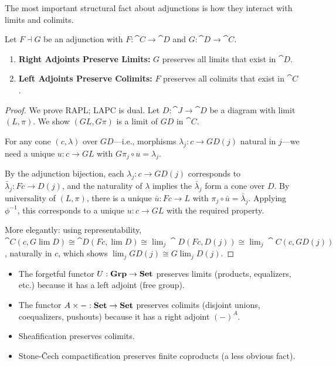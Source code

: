 The most important structural fact about adjunctions is how they interact with limits and colimits.

\begin{theorem}
\label{thm:rapl-lapc}
Let $F \dashv G$ be an adjunction with $F: \cat{C} \to \cat{D}$ and $G: \cat{D} \to \cat{C}$.
\begin{enumerate}
  \item[(RAPL)] \textbf{Right Adjoints Preserve Limits:} $G$ preserves all limits that exist in $\cat{D}$.
  \item[(LAPC)] \textbf{Left Adjoints Preserve Colimits:} $F$ preserves all colimits that exist in $\cat{C}$.
\end{enumerate}
\end{theorem}

\begin{proof}
We prove RAPL; LAPC is dual. Let $D: \cat{J} \to \cat{D}$ be a diagram with limit $(L, \pi)$. We show $(GL, G\pi)$ is a limit of $GD$ in $\cat{C}$.

For any cone $(c, \lambda)$ over $GD$—i.e., morphisms $\lambda_j: c \to GD(j)$ natural in $j$—we need a unique $u: c \to GL$ with $G\pi_j \circ u = \lambda_j$.

By the adjunction bijection, each $\lambda_j: c \to GD(j)$ corresponds to $\bar\lambda_j: Fc \to D(j)$, and the naturality of $\lambda$ implies the $\bar\lambda_j$ form a cone over $D$. By universality of $(L, \pi)$, there is a unique $\bar u: Fc \to L$ with $\pi_j \circ \bar u = \bar\lambda_j$. Applying $\phi^{-1}$, this corresponds to a unique $u: c \to GL$ with the required property.

More elegantly: using representability, $\cat{C}(c, G\lim D) \cong \cat{D}(Fc, \lim D) \cong \lim_j \cat{D}(Fc, D(j)) \cong \lim_j \cat{C}(c, GD(j))$, naturally in $c$, which shows $\lim_j GD(j) \cong G \lim_j D(j)$.
\end{proof}

\begin{example}[Consequences]
\begin{itemize}
  \item The forgetful functor $U: \mathbf{Grp} \to \mathbf{Set}$ preserves limits (products, equalizers, etc.) because it has a left adjoint (free group).
  \item The functor $A \times -: \mathbf{Set} \to \mathbf{Set}$ preserves colimits (disjoint unions, coequalizers, pushouts) because it has a right adjoint $(-)^A$.
  \item Sheafification preserves colimits.
  \item Stone-Čech compactification preserves finite coproducts (a less obvious fact).
\end{itemize}
\end{example}

